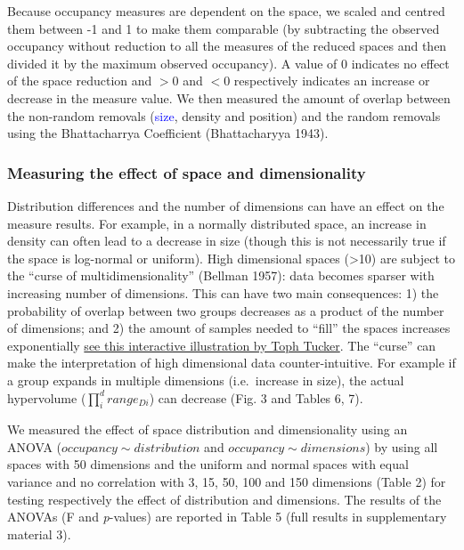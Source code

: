 \documentclass[]{article}
\begin{document}
\renewcommand\baselinestretch{1.6}\selectfont

Because occupancy measures are dependent on the space, we scaled and
centred them between -1 and 1 to make them comparable (by subtracting
the observed occupancy without reduction to all the measures of the
reduced spaces and then divided it by the maximum observed occupancy). A
value of 0 indicates no effect of the space reduction and \(>0\) and
\(<0\) respectively indicates an increase or decrease in the measure
value. We then measured the amount of overlap between the non-random
removals (\textcolor{blue}{size}, density and
position) and the random removals using the Bhattacharrya Coefficient
(Bhattacharyya 1943).

\subsubsection{Measuring the effect of space and
dimensionality}\label{measuring-the-effect-of-space-and-dimensionality}

Distribution differences and the number of dimensions can have an effect
on the measure results. For example, in a normally distributed space, an
increase in density can often lead to a decrease in size (though this is
not necessarily true if the space is log-normal or uniform). High
dimensional spaces (\textgreater{}10) are subject to the ``curse of
multidimensionality'' (Bellman 1957): data becomes sparser with
increasing number of dimensions. This can have two main consequences: 1)
the probability of overlap between two groups decreases as a product of
the number of dimensions; and 2) the amount of samples needed to
``fill'' the spaces increases exponentially
\href{https://observablehq.com/@tophtucker/theres-plenty-of-room-in-the-corners}{see
this interactive illustration by Toph Tucker}. The ``curse'' can make
the interpretation of high dimensional data counter-intuitive. For
example if a group expands in multiple dimensions (i.e.~increase in
size), the actual hypervolume (\(\prod_{i}^{d} range_{Di}\)) can
decrease (Fig. 3 and Tables 6, 7).

We measured the effect of space distribution and dimensionality using an
ANOVA (\(occupancy \sim distribution\) and
\(occupancy \sim dimensions\)) by using all spaces with 50 dimensions
and the uniform and normal spaces with equal variance and no correlation
with 3, 15, 50, 100 and 150 dimensions (Table 2) for testing
respectively the effect of distribution and dimensions. The results of
the ANOVAs (F and \emph{p}-values) are reported in Table 5 (full results
in supplementary material 3).
\end{document}

